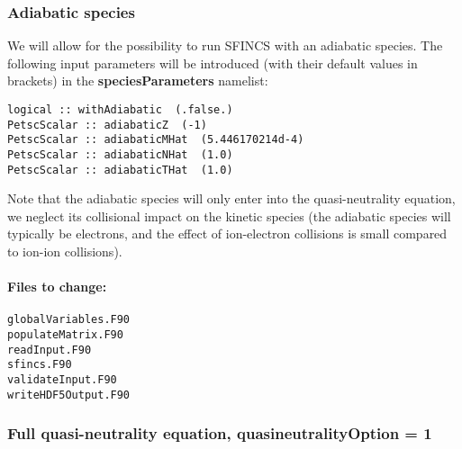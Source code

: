 \documentclass[12pt]{article}
\begin{document}
\subsubsection*{Adiabatic species}
We will allow for the possibility to run SFINCS with an adiabatic species. 
The following input parameters will be introduced (with their default values in brackets) in the \textbf{speciesParameters} namelist:
\begin{verbatim}
logical :: withAdiabatic  (.false.)
PetscScalar :: adiabaticZ  (-1)
PetscScalar :: adiabaticMHat  (5.446170214d-4)
PetscScalar :: adiabaticNHat  (1.0)
PetscScalar :: adiabaticTHat  (1.0)
\end{verbatim}
Note that the 
adiabatic species will only enter into the quasi-neutrality equation, 
we neglect its collisional impact on the kinetic species (the adiabatic species will typically be electrons, and the effect of ion-electron collisions is small compared to ion-ion collisions). 

\paragraph*{\textbf{Files to change:}}
\begin{verbatim}
globalVariables.F90
populateMatrix.F90
readInput.F90
sfincs.F90
validateInput.F90
writeHDF5Output.F90
\end{verbatim}

\subsubsection*{Full quasi-neutrality equation, quasineutralityOption = 1}
\end{document}
